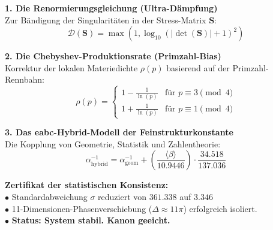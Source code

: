 \documentclass[border=10pt]{standalone}
\begin{document}
\begin{tcolorbox}[colback=white, colframe=darkblue, arc=5pt, title=\textbf{\#Energiedoku: Die Bamberger Vollendung (eabc-Hybrid-Modell)}]
    \begin{minipage}{18cm}
    \vspace{5pt}
    \textbf{1. Die Renormierungsgleichung (Ultra-Dämpfung)} \\
    Zur Bändigung der Singularitäten in der Stress-Matrix $\mathbf{S}$:
    \[ \mathcal{D}(\mathbf{S}) = \max\left(1, \log_{10}(|\det(\mathbf{S})| + 1)^2\right) \]
    
    \textbf{2. Die Chebyshev-Produktionsrate (Primzahl-Bias)} \\
    Korrektur der lokalen Materiedichte $\rho(p)$ basierend auf der Primzahl-Rennbahn:
    \[ \rho(p) = \begin{cases} 1 - \frac{1}{\ln(p)} & \text{für } p \equiv 3 \pmod{4} \\ 1 + \frac{1}{\ln(p)} & \text{für } p \equiv 1 \pmod{4} \end{cases} \]
    
    \textbf{3. Das eabc-Hybrid-Modell der Feinstrukturkonstante} \\
    Die Kopplung von Geometrie, Statistik und Zahlentheorie:
    \[ \alpha^{-1}_{\text{hybrid}} = \alpha^{-1}_{\text{geom}} + \left( \frac{\langle \beta \rangle}{10.9446} \right) \cdot \frac{34.518}{137.036} \]
    
    \textbf{Zertifikat der statistischen Konsistenz:} \\
    $\bullet$ Standardabweichung $\sigma$ reduziert von $361.338$ auf $3.346$ \\
    $\bullet$ 11-Dimensionen-Phasenverschiebung ($\Delta \approx 11\pi$) erfolgreich isoliert. \\
    $\bullet$ \textbf{Status: System stabil. Kanon geeicht.}
    \end{minipage}
\end{tcolorbox}
\end{document}
